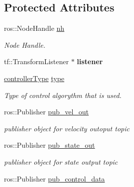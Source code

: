 \subsection*{Protected Attributes}
\begin{DoxyCompactItemize}
\item 
ros\+::\+Node\+Handle \hyperlink{classController_a24e3d3c2536f6ed29018bad1fd53dae2}{nh}\hypertarget{classController_a24e3d3c2536f6ed29018bad1fd53dae2}{}\label{classController_a24e3d3c2536f6ed29018bad1fd53dae2}

\begin{DoxyCompactList}\small\item\em Node Handle. \end{DoxyCompactList}\item 
tf\+::\+Transform\+Listener $\ast$ {\bfseries listener}\hypertarget{classController_afea373f808d583e4ad613f119439a8f5}{}\label{classController_afea373f808d583e4ad613f119439a8f5}

\item 
\hyperlink{classController_a86221d052db839985bd6e4d73013cd06}{controller\+Type} \hyperlink{classController_af2488a28d3390288db92fa1d92aaed52}{type}\hypertarget{classController_af2488a28d3390288db92fa1d92aaed52}{}\label{classController_af2488a28d3390288db92fa1d92aaed52}

\begin{DoxyCompactList}\small\item\em Type of control algorythm that is used. \end{DoxyCompactList}\item 
ros\+::\+Publisher \hyperlink{classController_a8428549596cff57f48390ac25706545a}{pub\+\_\+vel\+\_\+out}\hypertarget{classController_a8428549596cff57f48390ac25706545a}{}\label{classController_a8428549596cff57f48390ac25706545a}

\begin{DoxyCompactList}\small\item\em publisher object for velocity outoput topic \end{DoxyCompactList}\item 
ros\+::\+Publisher \hyperlink{classController_a6abeaf23d1c17d6af6eecf7d1479fe31}{pub\+\_\+state\+\_\+out}\hypertarget{classController_a6abeaf23d1c17d6af6eecf7d1479fe31}{}\label{classController_a6abeaf23d1c17d6af6eecf7d1479fe31}

\begin{DoxyCompactList}\small\item\em publisher object for state output topic \end{DoxyCompactList}\item 
ros\+::\+Publisher \hyperlink{classController_afde3eefcf7ac040b2a38a8d1e95a6077}{pub\+\_\+control\+\_\+data}\hypertarget{classController_afde3eefcf7ac040b2a38a8d1e95a6077}{}\label{classController_afde3eefcf7ac040b2a38a8d1e95a6077}


\end{DoxyCompactItemize}
